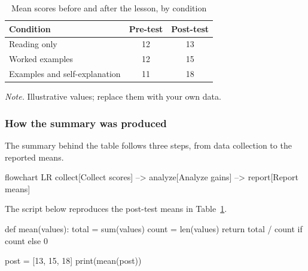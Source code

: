 \documentclass[a4paper,12pt]{article}
\begin{document}
  \begin{table}[H]
    \caption{Mean scores before and after the lesson, by condition}
    \label{tab:gains}
    \begin{tabular}{@{}lcc@{}}
      \toprule
      Condition & Pre-test & Post-test \\
      \midrule
      Reading only & 12 & 13 \\
      Worked examples & 12 & 15 \\
      Examples and self-explanation & 11 & 18 \\
      \bottomrule
    \end{tabular}
    \par\medskip
    \begin{minipage}{\linewidth}
      \footnotesize\textit{Note.} Illustrative values; replace them with
      your own data.
    \end{minipage}
  \end{table}

  \subsubsection{How the summary was produced}
  The summary behind the table follows three steps, from data collection
  to the reported means.

  \begin{mermaid}[style=monochrome, caption={General flow of the analysis}, pos=H]
    flowchart LR
    collect[Collect scores] --> analyze[Analyze gains] --> report[Report means]
  \end{mermaid}

  The script below reproduces the post-test means in
  Table~\ref{tab:gains}.

  \begin{code}[lang=python, numbers=true]
def mean(values):
    total = sum(values)
    count = len(values)
    return total / count if count else 0

post = [13, 15, 18]
print(mean(post))
  \end{code}
\end{document}
